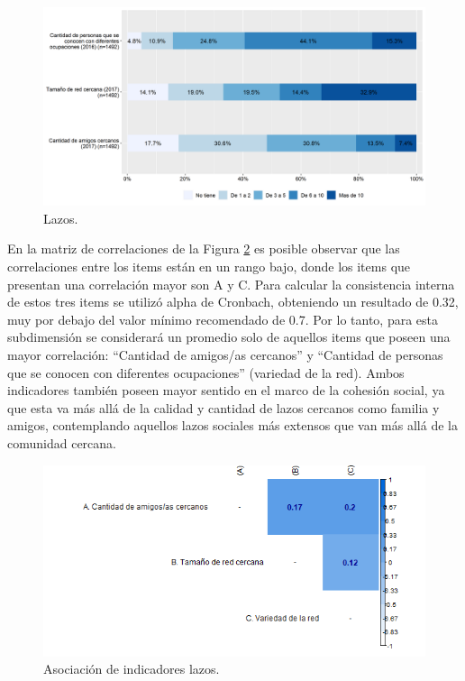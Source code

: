 \documentclass[
  12pt,
]{book}
\begin{document}
\begin{figure}[H]

{\centering \includegraphics[width=1\linewidth,height=1\textheight]{output/graphs/lazos} 

}

\caption{Lazos.}\label{fig:lazos}
\end{figure}

En la matriz de correlaciones de la Figura \ref{fig:lazos-cor} es posible observar que las correlaciones entre los items están en un rango bajo, donde los items que presentan una correlación mayor son A y C. Para calcular la consistencia interna de estos tres items se utilizó alpha de Cronbach, obteniendo un resultado de 0.32, muy por debajo del valor mínimo recomendado de 0.7. Por lo tanto, para esta subdimensión se considerará un promedio solo de aquellos items que poseen una mayor correlación: ``Cantidad de amigos/as cercanos'' y ``Cantidad de personas que se conocen con diferentes ocupaciones'' (variedad de la red). Ambos indicadores también poseen mayor sentido en el marco de la cohesión social, ya que esta va más allá de la calidad y cantidad de lazos cercanos como familia y amigos, contemplando aquellos lazos sociales más extensos que van más allá de la comunidad cercana.

\begin{figure}[H]

{\centering \includegraphics[width=1\linewidth,height=1\textheight]{output/graphs/lazos_cor} 

}

\caption{Asociación de indicadores lazos.}\label{fig:lazos-cor}
\end{figure}
\end{document}
